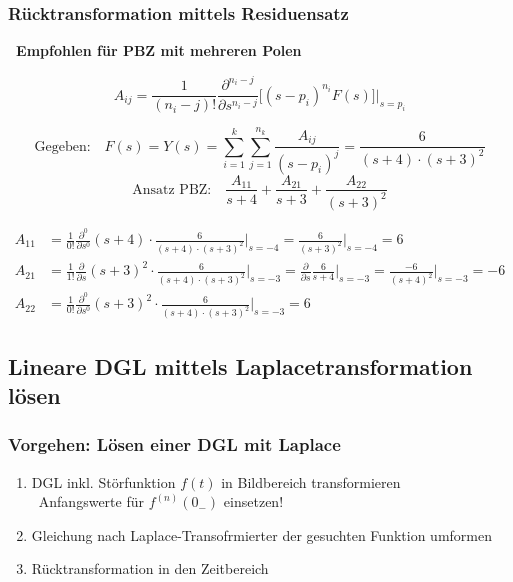 \subsubsection{Rücktransformation mittels Residuensatz}

\textbf{ \textrightarrow\ Empfohlen für PBZ mit mehreren Polen}

$$ \boxed{ A_{ij} = \frac{1}{(n_i - j)!} \frac{\partial^{n_i - j}}{\partial s^{n_i-j}} \big[ (s-p_i)^{n_i} F(s) \big] \Bigg|_{s = p_i} } $$



$$\text{Gegeben:} \quad  F(s) = Y(s) = \sum\limits_{i=1}^k  \sum\limits_{j=1}^{n_k} \frac{A_{ij}}{(s-p_i)^j} = \frac{6}{(s+4) \cdot (s+3)^2} $$
$$ \text{Ansatz PBZ:} \quad \frac{A_{11}}{s+4} + \frac{A_{21}}{s+3} + \frac{A_{22}}{(s+3)^2} $$

\begin{align*}
    A_{11}  &= \frac{1}{0!} \frac{\partial^0}{\partial s^0} (s+4) \cdot \frac{6}{(s+4) \cdot (s+3)^2} \Big|_{s = -4} = \frac{6}{(s+3)^2} \Big|_{s = -4} = 6 \\
    A_{21}  &= \frac{1}{1!} \frac{\partial}{\partial s} (s+3)^2 \cdot \frac{6}{(s+4) \cdot (s+3)^2} \Big|_{s = -3} =  \frac{\partial}{\partial s} \frac{6}{s+4} \Big|_{s = -3} = \frac{-6}{(s+4)^2} \Big|_{s = -3} = -6 \\
    A_{22}  &= \frac{1}{0!} \frac{\partial^0}{\partial s^0} (s+3)^2 \cdot \frac{6}{(s+4) \cdot (s+3)^2} \Big|_{s = -3} = 6
\end{align*}


\subsection{Lineare DGL mittels Laplacetransformation lösen}
		
\subsubsection{Vorgehen: Lösen einer DGL mit Laplace}
		
\begin{enumerate}
    \item DGL inkl. Störfunktion $f(t)$ in Bildbereich transformieren \\
        \textrightarrow\ Anfangswerte für $f^{(n)}(0_-)$ einsetzen!
    \item Gleichung nach Laplace-Transofrmierter der gesuchten Funktion umformen
    \item Rücktransformation in den Zeitbereich
\end{enumerate}

